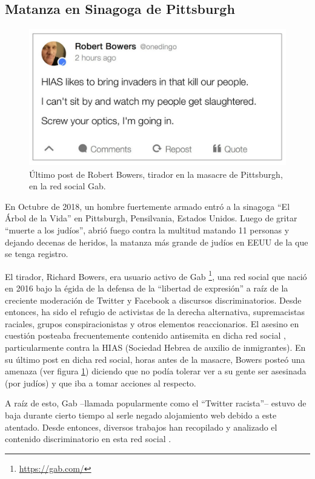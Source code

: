 \subsection{Matanza en Sinagoga de Pittsburgh}


\begin{figure}[t]
    \centering
    \includegraphics[height=6cm, keepaspectratio]{img/gab-pittsburgh-post.jpg}
    \caption{Último post de Robert Bowers, tirador en la masacre de Pittsburgh, en la red social Gab.}
    \label{fig:gab_post}
\end{figure}


En Octubre de 2018, un hombre fuertemente armado entró a la sinagoga ``El Árbol de la Vida'' en Pittsburgh, Pensilvania, Estados Unidos. Luego de gritar ``muerte a los judíos'', abrió fuego contra la multitud matando 11 personas y dejando decenas de heridos, la matanza más grande de judíos en EEUU de la que se tenga registro.

El tirador, Richard Bowers, era usuario activo de Gab \footnote{\url{https://gab.com/}}, una red social que nació en 2016 bajo la égida de la defensa de la ``libertad de expresión'' a raíz de la creciente moderación de Twitter y Facebook a discursos discriminatorios. Desde entonces, ha sido el refugio de activistas de la derecha alternativa, supremacistas raciales, grupos conspiracionistas y otros elementos reaccionarios. El asesino en cuestión posteaba frecuentemente contenido antisemita en dicha red social \cite{mcilroy2019welcome}, particularmente contra la HIAS (Sociedad Hebrea de auxilio de inmigrantes). En su último post en dicha red social, horas antes de la masacre, Bowers posteó una amenaza (ver figura \ref{fig:gab_post}) diciendo que no podía tolerar ver a su gente ser asesinada (por judíos) y que iba a tomar acciones al respecto.

A raíz de esto, Gab --llamada popularmente como el ``Twitter racista''-- estuvo de baja durante cierto tiempo al serle negado alojamiento web debido a este atentado. Desde entonces, diversos trabajos han recopilado y analizado el contenido discriminatorio en esta red social \cite{mcilroy2019welcome,kennedy2018gab}.



